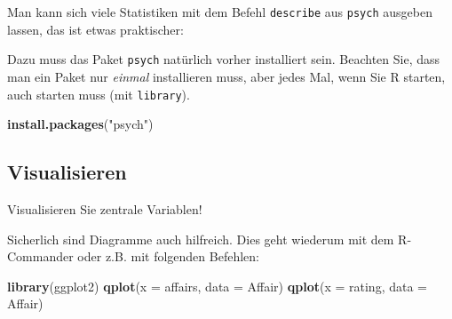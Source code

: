 \documentclass[12pt,ngerman,]{book}
\makeatletter
\newenvironment{Shaded}{\begin{snugshade}}{\end{snugshade}}
\newcommand{\KeywordTok}[1]{\textcolor[rgb]{0.13,0.29,0.53}{\textbf{{#1}}}}
\newcommand{\DataTypeTok}[1]{\textcolor[rgb]{0.13,0.29,0.53}{{#1}}}
\newcommand{\StringTok}[1]{\textcolor[rgb]{0.31,0.60,0.02}{{#1}}}
\newcommand{\CommentTok}[1]{\textcolor[rgb]{0.56,0.35,0.01}{\textit{{#1}}}}
\newcommand{\NormalTok}[1]{{#1}}
\newenvironment{kframe}{%
\medskip{}
\setlength{\fboxsep}{.8em}
 \def\at@end@of@kframe{}%
 \ifinner\ifhmode%
  \def\at@end@of@kframe{\end{minipage}}%
  \begin{minipage}{\columnwidth}%
 \fi\fi%
 \def\FrameCommand##1{\hskip\@totalleftmargin \hskip-\fboxsep
 \colorbox{shadecolor}{##1}\hskip-\fboxsep
     \hskip-\linewidth \hskip-\@totalleftmargin \hskip\columnwidth}%
 \MakeFramed {\advance\hsize-\width
   \@totalleftmargin\z@ \linewidth\hsize
   \@setminipage}}%
 {\par\unskip\endMakeFramed%
 \at@end@of@kframe}
\renewenvironment{Shaded}{\begin{kframe}}{\end{kframe}}
\theoremstyle{definition}
\theoremstyle{definition}
\theoremstyle{remark}
\makeatother
\begin{document}
Man kann sich viele Statistiken mit dem Befehl \texttt{describe} aus
\texttt{psych} ausgeben lassen, das ist etwas praktischer:

\begin{Shaded}
\end{Shaded}

Dazu muss das Paket \texttt{psych} natürlich vorher installiert sein.
Beachten Sie, dass man ein Paket nur \emph{einmal} installieren muss,
aber jedes Mal, wenn Sie R starten, auch starten muss (mit
\texttt{library}).

\begin{Shaded}
\begin{Highlighting}[]
\KeywordTok{install.packages}\NormalTok{(}\StringTok{"psych"}\NormalTok{)}
\end{Highlighting}
\end{Shaded}

\subsection{Visualisieren}\label{visualisieren}

Visualisieren Sie zentrale Variablen!

Sicherlich sind Diagramme auch hilfreich. Dies geht wiederum mit dem
R-Commander oder z.B. mit folgenden Befehlen:

\begin{Shaded}
\begin{Highlighting}[]

\KeywordTok{library}\NormalTok{(ggplot2)}
\KeywordTok{qplot}\NormalTok{(}\DataTypeTok{x =} \NormalTok{affairs, }\DataTypeTok{data =} \NormalTok{Affair)}
\KeywordTok{qplot}\NormalTok{(}\DataTypeTok{x =} \NormalTok{rating, }\DataTypeTok{data =} \NormalTok{Affair)}
\end{Highlighting}
\end{Shaded}
\end{document}

